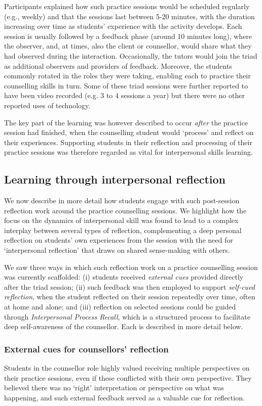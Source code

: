 \documentclass{sigchi}
\begin{document}
Participants explained how such practice sessions would be scheduled regularly (e.g., weekly) and that the sessions last between 5-20 minutes, with the duration increasing over time as students' experience with the activity develops. Each session is usually followed by a feedback phase (around 10 minutes long), where the observer, and, at times, also the client or counsellor, would share what they had observed during the interaction. Occasionally, the tutors would join the triad as additional observers and providers of feedback. Moreover, the students commonly rotated in the roles they were taking, enabling each to practice their counselling skills in turn. Some of these triad sessions were further reported to have been video recorded (e.g. 3 to 4 sessions a year) but there were no other reported uses of technology. 

The key part of the learning was however described to occur \emph{after} the practice session had finished, when the counselling student would `process' and reflect on their experiences. Supporting students in their reflection and processing of their practice sessions was therefore regarded as vital for interpersonal skills learning. 

\subsection{Learning through interpersonal reflection}
We now describe in more detail how students engage with such post-session reflection work around the practice counselling sessions. We highlight how the focus on the dynamics of interpersonal skill was found to lead to a complex interplay between several types of reflection, complementing a deep personal reflection on students' own experiences from the session with the need for `interpersonal reflection' that draws on shared sense-making with others.

We saw three ways in which such reflection work on a practice counselling session was currently scaffolded: (i) students received \emph{external cues} provided directly after the triad session; (ii) such feedback was then employed to support \emph{self-cued reflection}, when the student reflected on their session repeatedly over time, often at home and alone; and (iii) reflection on selected sessions could be guided through \emph{Interpersonal Process Recall}, which is a structured process to facilitate deep self-awareness of the counsellor. Each is described in more detail below.

\subsubsection{External cues for counsellors' reflection}
Students in the counsellor role highly valued receiving multiple perspectives on their practice sessions, even if these conflicted with their own perspective. They believed there was no `right' interpretation or perspective on what was happening, and such external feedback served as a valuable cue for reflection. 
\end{document}
